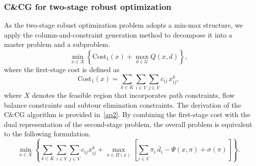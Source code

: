 \documentclass[preprint,12pt,authoryear]{elsarticle}
\begin{document}
\subsubsection{C\&CG for two-stage robust optimization}
As the two-stage robust optimization problem adopts a min-max structure, we apply the column-and-constraint generation method to decompose it into a master problem and a subproblem.
\begin{equation}
    \min_{x\in X} \left\{ \text{Cost}_1(x) + \max_{d \in \mathcal{U}} Q(x,d) \right\},
\end{equation}
where the first-stage cost is defined as
\begin{equation}
    \text{Cost}_1(x) = \sum_{k\in K}\sum_{i\in V}\sum_{j\in V} c_{ij} \, x_{ij}^k,
\end{equation}
where $X$ denotes the feasible region that incorporates path constraints, flow balance constraints and subtour elimination constraints. The derivation of the C\&CG algorithm is provided in~\ref{ap2}. By combining the first-stage cost with the dual representation of the second-stage problem, the overall problem is equivalent to the following formulation.
\begin{equation}
\min_{x \in X} \left\{ \sum_{k\in K}\sum_{i\in V}\sum_{j\in V}c_{ij}x_{ij}^k + \max_{\pi\in \Pi(x)} \left[ \sum_{i\in V} \pi_i\, \bar{d}_i - \Psi(x,\pi) + \sigma(\pi) \right] \right\}.
\end{equation}
\end{document}
